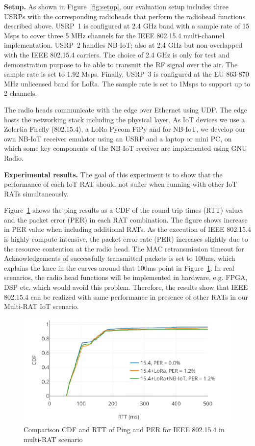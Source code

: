 \documentclass[10pt,emptycopyrightspace]{ewsn-proc}
\newcommand{\fakepar}[1]{\noindent\textbf{#1.}}
\begin{document}
\fakepar{Setup} As shown in Figure~\ref{fig:setup}, our evaluation setup includes
three USRPs with the corresponding radioheads that perform the
radiohead functions described above. USRP~1 is configured at 2.4 GHz
band with a sample rate of 15 Msps to cover three 5 MHz channels for
the IEEE 802.15.4 multi-channel implementation. USRP~2 handles NB-IoT;
also at 2.4 GHz but non-overlapped with the IEEE 802.15.4
carriers. The choice of 2.4 GHz is only for test and demonstration
purpose to be able to transmit the RF signal over the air. The sample
rate is set to 1.92 Msps. Finally, USRP~3 is
configured at the EU 863-870 MHz unlicensed band for LoRa. The sample
rate is set to 1Msps to support up to 2 channels.

The radio heads communicate with the edge over Ethernet using UDP. The edge hosts the networking stack including the physical layer. As IoT devices we use a Zolertia Firefly (802.15.4), a LoRa  Pycom FiPy and for NB-IoT, we develop our own NB-IoT receiver emulator using an USRP and a laptop or mini PC, on which some key components of the NB-IoT receiver are implemented using GNU Radio.

\fakepar{Experimental results}
The goal of this experiment is to show that the
performance of each IoT RAT should not suffer when running with other IoT RATs simultaneously.

Figure~\ref{fig:5-5} shows the ping results as a CDF of
the round-trip times (RTT) values and the packet error (PER) in
each RAT combination.  The figure shows increase in PER value when
including additional RATs.  As the execution of IEEE 802.15.4 is
highly compute intensive, the packet error rate (PER) increases
slightly due to the resource contention at the radio head. The MAC retransmission timeout for Acknowledgements of
successfully transmitted packets is set to 100ms, which explains the
knee in the curves around that 100ms point in Figure~\ref{fig:5-5}.
In real scenarios, the radio head functions will be implemented in
hardware, e.g. FPGA, DSP etc. which would avoid this
problem. Therefore, the results show that IEEE 802.15.4 can be
realized with same performance in presence of other RATs in our
Multi-RAT IoT scenario.



\begin{figure}[h]
  \centering
	\includegraphics[width= 0.4 \textwidth]{5-5.png}
	\caption{Comparison CDF and RTT of Ping and PER for IEEE
802.15.4 in multi-RAT scenario}
	\label{fig:5-5}
\end{figure}
\end{document}
